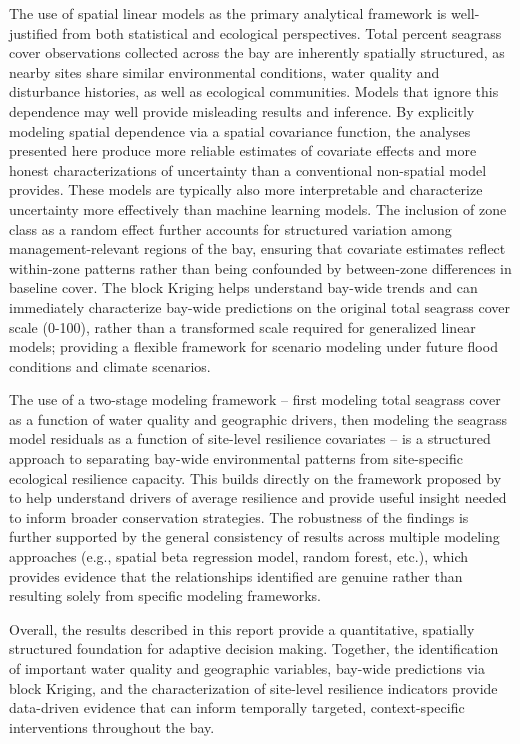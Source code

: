 \documentclass[
  letterpaper,
  DIV=11,
  numbers=noendperiod]{scrartcl}
\begin{document}
The use of spatial linear models as the primary analytical framework is
well-justified from both statistical and ecological perspectives. Total
percent seagrass cover observations collected across the bay are
inherently spatially structured, as nearby sites share similar
environmental conditions, water quality and disturbance histories, as
well as ecological communities. Models that ignore this dependence may
well provide misleading results and inference. By explicitly modeling
spatial dependence via a spatial covariance function, the analyses
presented here produce more reliable estimates of covariate effects and
more honest characterizations of uncertainty than a conventional
non-spatial model provides. These models are typically also more
interpretable and characterize uncertainty more effectively than machine
learning models. The inclusion of zone class as a random effect further
accounts for structured variation among management-relevant regions of
the bay, ensuring that covariate estimates reflect within-zone patterns
rather than being confounded by between-zone differences in baseline
cover. The block Kriging helps understand bay-wide trends and can
immediately characterize bay-wide predictions on the original total
seagrass cover scale (0-100), rather than a transformed scale required
for generalized linear models; providing a flexible framework for
scenario modeling under future flood conditions and climate scenarios.

The use of a two-stage modeling framework -- first modeling total
seagrass cover as a function of water quality and geographic drivers,
then modeling the seagrass model residuals as a function of site-level
resilience covariates -- is a structured approach to separating bay-wide
environmental patterns from site-specific ecological resilience
capacity. This builds directly on the framework proposed by
\citet{gilby2023drivers} to help understand drivers of average
resilience and provide useful insight needed to inform broader
conservation strategies. The robustness of the findings is further
supported by the general consistency of results across multiple modeling
approaches (e.g., spatial beta regression model, random forest, etc.),
which provides evidence that the relationships identified are genuine
rather than resulting solely from specific modeling frameworks.

Overall, the results described in this report provide a quantitative,
spatially structured foundation for adaptive decision making. Together,
the identification of important water quality and geographic variables,
bay-wide predictions via block Kriging, and the characterization of
site-level resilience indicators provide data-driven evidence that can
inform temporally targeted, context-specific interventions throughout
the bay.
\end{document}
